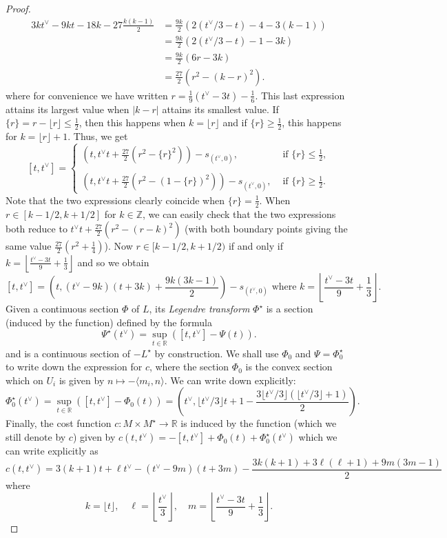 \documentclass[10pt,a4paper]{amsart}
\newcommand{\RR}{\mathbb{R}}
\newcommand{\ZZ}{\mathbb{Z}}
\begin{document}
\begin{proof}
\begin{align*}
    3kt^\vee-9kt-18k-27\frac{k(k-1)}{2}&=\frac{9k}{2}\left(2(t^\vee/3 - t)-4-3(k-1)\right)\\
    &=\frac{9k}{2}\left(2(t^\vee/3 - t)-1-3k\right)\\
    &= \frac{9k}{2}(6r-3k)\\
    &= \frac{27}{2}(r^2-(k-r)^2).
\end{align*}
where for convenience we have written $r=\frac{1}{9}(t^\vee-3t)-\frac{1}{6}$. This last expression attains its largest value when $|k-r|$ attains its smallest value. If $\{r\} = r-\lfloor r \rfloor \leq\frac{1}{2}$, then this happens when $k=\lfloor r \rfloor$ and if $\{r\} \geq \frac{1}{2}$, this happens for $k=\lfloor r \rfloor +1$. Thus, we get 
\[
[t,t^\vee] =
\begin{cases}
    (t, t^\vee t + \frac{27}{2}(r^2-\{r\}^2))-s_{(t^\vee,0)}, & \textrm{ if } \{r\}\leq \frac{1}{2},\\
    \\
    (t, t^\vee t + \frac{27}{2}(r^2-(1-\{r\})^2))-s_{(t^\vee,0)}, & \textrm{ if } \{r\}\geq \frac{1}{2}.
\end{cases}
\]
Note that the two expressions clearly coincide when $\{r\} = \frac{1}{2}$. When $r\in[k-1/2,k+1/2]$ for $k\in \ZZ$, we can easily check that the two expressions both reduce to $t^\vee t + \frac{27}{2}(r^2-(r-k)^2)$ (with both boundary points giving the same value $\frac{27}{2}(r^2+\frac{1}{4})$). Now $r\in [k-1/2,k+1/2)$ if and only if $k=\left\lfloor \frac{t^\vee-3t}{9}+\frac{1}{3}\right\rfloor$ and so we obtain
\[
[t,t^\vee]=\left(t,(t^\vee-9k)(t+3k)+\frac{9k(3k-1)}{2}\right) -s_{(t^\vee,0)} \textrm{ where } k=\left\lfloor \frac{t^\vee-3t}{9}+\frac{1}{3}\right\rfloor.
\]
Given a continuous section $\Phi$ of $L$, its \emph{Legendre transform} $\Phi^\star$ is a section (induced by the function) defined by the formula 
\[
\Psi^\star(t^\vee) = \sup_{t\in \RR} \left([t,t^\vee]-\Psi(t)\right).
\]
and is a continuous section of $-L^\star$ by construction. We shall use $\Phi_0$ and $\Psi = \Phi_0^\star$ to write down the expression for $c$, where the section $\Phi_0$ is the convex section which on $U_i$ is given by $n\mapsto -\langle m_i,n\rangle$. We can write down explicitly:
\[
\Phi_0^\star(t^\vee)=\sup_{t\in \RR} \left([t,t^\vee]-\Phi_0(t)\right) = \left(t^\vee, \lfloor t^\vee /3 \rfloor t + 1-\frac{3\lfloor t^\vee /3 \rfloor(\lfloor t^\vee /3 \rfloor+1)}{2} \right).
\]
Finally, the cost function $c:M\times M^\star\to \RR$ is induced by the function (which we still denote by $c$) given by $c(t,t^\vee)=-[t,t^\vee]+\Phi_0(t)+\Phi_0^\star(t^\vee)$ which we can write explicitly as 
\begin{equation}\label{eq:Cost}
c(t,t^\vee) = 3(k+1)t + \ell t^\vee-(t^\vee -9m)(t+3m) - \frac{3k(k+1)+3\ell(\ell+1)+9m(3m-1)}{2}
\end{equation}
where
\[
k= \lfloor t \rfloor, \quad \ell = \left\lfloor \frac{t^\vee}{3}\right\rfloor, \quad m =\left \lfloor \frac{t^\vee-3t}{9}+\frac{1}{3}\right\rfloor.
\]
\end{proof}
\end{document}

